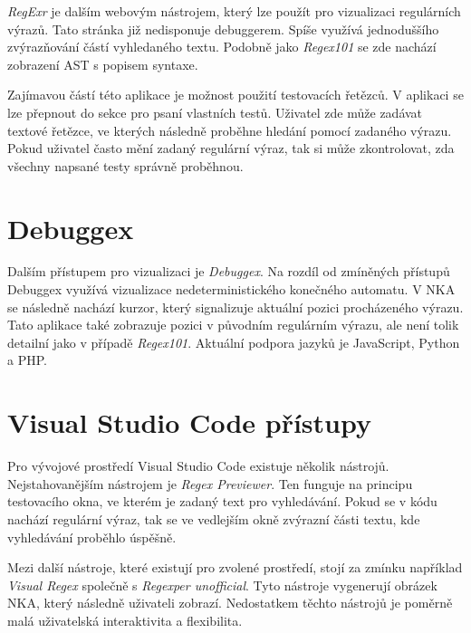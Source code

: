 \textit{RegExr}\cite{RegExr} je dalším webovým nástrojem, který lze použít pro vizualizaci regulárních výrazů.
Tato stránka již nedisponuje debuggerem.
Spíše využívá jednoduššího zvýrazňování částí vyhledaného textu.
Podobně jako \textit{Regex101} se zde nachází zobrazení AST s popisem syntaxe.

Zajímavou částí této aplikace je možnost použití testovacích řetězců.
V aplikaci se lze přepnout do sekce pro psaní vlastních testů.
Uživatel zde může zadávat textové řetězce, ve kterých následně proběhne hledání pomocí zadaného výrazu.
Pokud uživatel často mění zadaný regulární výraz, tak si může zkontrolovat, zda všechny napsané testy správně proběhnou.

\section{Debuggex}

Dalším přístupem pro vizualizaci je \textit{Debuggex}\cite{Toarca}.
Na rozdíl od zmíněných přístupů Debuggex využívá vizualizace nedeterministického konečného automatu.
V NKA se následně nachází kurzor, který signalizuje aktuální pozici procházeného výrazu.
Tato aplikace také zobrazuje pozici v původním regulárním výrazu, ale není tolik detailní jako v případě \textit{Regex101}.
Aktuální podpora jazyků je JavaScript, Python a PHP.

\section{Visual Studio Code přístupy}

Pro vývojové prostředí Visual Studio Code existuje několik nástrojů.
Nejstahovanějším nástrojem je \textit{Regex Previewer}\cite{Marti_2016}.
Ten funguje na principu testovacího okna, ve kterém je zadaný text pro vyhledávání.
Pokud se v kódu nachází regulární výraz, tak se ve vedlejším okně zvýrazní části textu, kde vyhledávání proběhlo úspěšně. 

Mezi další nástroje, které existují pro zvolené prostředí, stojí za zmínku například \textit{Visual Regex}\cite{González_2021} společně s \textit{Regexper unofficial}\cite{Perricone_2019}.
Tyto nástroje vygenerují obrázek NKA, který následně uživateli zobrazí.
Nedostatkem těchto nástrojů je poměrně malá uživatelská interaktivita a flexibilita.